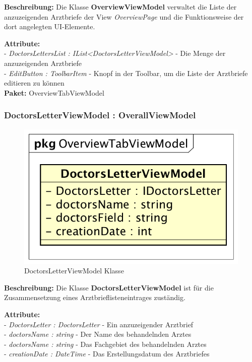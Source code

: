 \documentclass[a4paper]{scrreprt}
\begin{document}
\textbf{Beschreibung:} Die Klasse \textbf{OverviewViewModel} verwaltet die Liste der anzuzeigenden Arztbriefe der View \textit{OverviewPage} und die Funktionsweise der dort angelegten UI-Elemente.

\textbf{Attribute:}\\
- \textit{DoctorsLettersList : IList<DoctorsLetterViewModel>} - Die Menge der anzuzeigenden Arztbriefe\\
- \textit{EditButton : ToolbarItem} - Knopf in der Toolbar, um die Liste der Arztbriefe editieren zu können\\

\textbf{Paket:} OverviewTabViewModel

\subsubsection{DoctorsLetterViewModel : OverallViewModel}
\begin{figure}[H]
\centering
\includegraphics[width=0.45\textheight]{graphics/Klassendiagramme/ViewModel/DoctorsLetterViewModel.png}
\caption{DoctorsLetterViewModel Klasse}
\end{figure}

\textbf{Beschreibung:} Die Klasse \textbf{DoctorsLetterViewModel} ist für die Zusammensetzung eines Arztbrieflisteneintrages zuständig.

\textbf{Attribute:}\\
- \textit{DoctorsLetter : DoctorsLetter} - Ein anzuzeigender Arztbrief\\
- \textit{doctorsName : string} - Der Name des behandelnden Arztes\\
- \textit{doctorsName : string} - Das Fachgebiet des behandelnden Arztes\\
- \textit{creationDate : DateTime} - Das Erstellungsdatum des Arztbriefes\\
\end{document}
